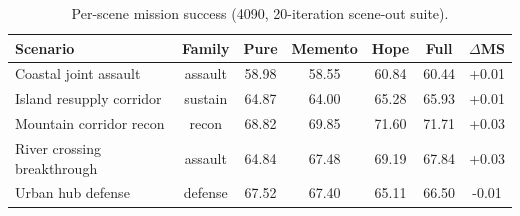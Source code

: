 \begin{table}[ht]
\centering
\caption{Per-scene mission success (4090, 20-iteration scene-out suite).}
\label{tab:generalization-scenes}
\small
\setlength{\tabcolsep}{4pt}
\begin{tabular}{lcccccc}
\toprule
Scenario & Family & Pure & Memento & Hope & Full & $\Delta$MS \\
\midrule
Coastal joint assault & assault & 58.98 & 58.55 & 60.84 & 60.44 & +0.01 \\
Island resupply corridor & sustain & 64.87 & 64.00 & 65.28 & 65.93 & +0.01 \\
Mountain corridor recon & recon & 68.82 & 69.85 & 71.60 & 71.71 & +0.03 \\
River crossing breakthrough & assault & 64.84 & 67.48 & 69.19 & 67.84 & +0.03 \\
Urban hub defense & defense & 67.52 & 67.40 & 65.11 & 66.50 & -0.01 \\
\bottomrule
\end{tabular}
\end{table}






